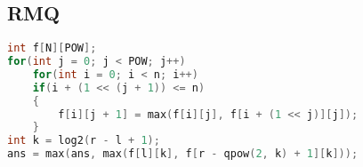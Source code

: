 ﻿\subsection{RMQ}
	\begin{lstlisting}[language=C++]
int f[N][POW];
for(int j = 0; j < POW; j++)
    for(int i = 0; i < n; i++)
    if(i + (1 << (j + 1)) <= n)
    {
        f[i][j + 1] = max(f[i][j], f[i + (1 << j)][j]);
    }
int k = log2(r - l + 1);
ans = max(ans, max(f[l][k], f[r - qpow(2, k) + 1][k]));	  	
	\end{lstlisting}